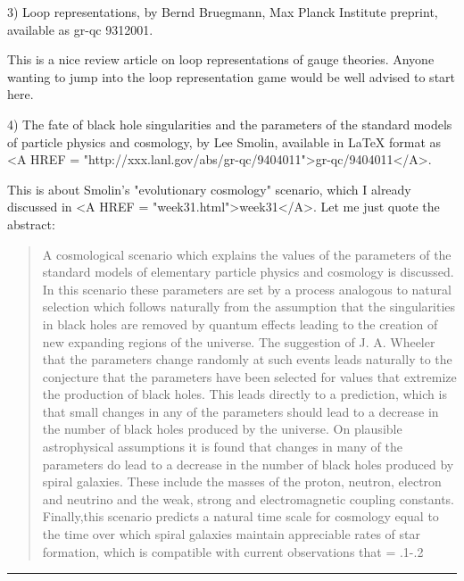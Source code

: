3) Loop representations, by Bernd Bruegmann, Max Planck Institute
preprint, available as gr-qc 9312001.  

This is a nice review article on loop representations of gauge theories.
Anyone wanting to jump into the loop representation game would be well
advised to start here.

4) The fate of black hole singularities and the parameters of the standard
models of particle physics and cosmology, by Lee Smolin, available in
LaTeX format as <A HREF = "http://xxx.lanl.gov/abs/gr-qc/9404011">gr-qc/9404011</A>.  

This is about Smolin's "evolutionary cosmology" scenario, which I
already discussed in <A HREF = "week31.html">week31</A>.  Let me just quote the abstract:

\begin{quote}
A cosmological scenario which explains the values of the parameters of the
standard models of elementary particle physics and cosmology is discussed.
In this scenario these parameters are set by a process analogous to natural
selection which follows naturally from the assumption that the singularities
in black holes are removed by quantum effects leading to the creation of new
expanding regions of the universe.  The suggestion of J. A. Wheeler that the
parameters change randomly at such events leads naturally to the conjecture
that the parameters have been selected for values that extremize the
production of black holes. This leads directly to a prediction, which is that
small changes in any of the parameters should lead to a decrease in the number
of black holes produced by the universe.  On plausible astrophysical
assumptions it is found that changes in many of the parameters do lead to a
decrease in the number of black holes produced by spiral galaxies. These
include the masses of the proton, neutron, electron and neutrino and the weak,
strong and electromagnetic coupling constants. Finally,this scenario predicts
a natural time scale for cosmology equal to the time over which spiral
galaxies maintain appreciable rates of star formation, which is compatible
with current observations that \Omega  = .1-.2  
\end{quote}



\par\noindent\rule{\textwidth}{0.4pt}
